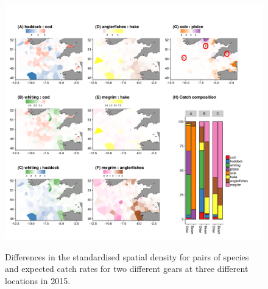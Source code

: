 \documentclass{nature}
\begin{document}
\begin{figure}
\begin{center}
	\includegraphics[width = \linewidth]{"figures/Figure 4 - DensityDifferencesFigureswithCC"}
	\label{fig:4}
	\caption{Differences in the standardised spatial density for pairs of
		species and expected catch rates for two different gears at
		three different locations in 2015.}
\end{center}
\end{figure}
\end{document}
